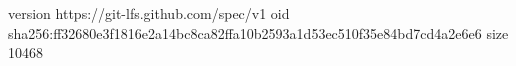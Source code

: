 version https://git-lfs.github.com/spec/v1
oid sha256:ff32680e3f1816e2a14bc8ca82ffa10b2593a1d53ec510f35e84bd7cd4a2e6e6
size 10468
